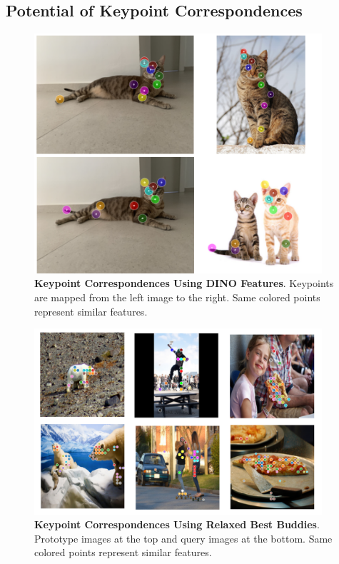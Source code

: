 \subsection{Potential of Keypoint Correspondences}
\label{section:keypoint-correspondences}
\begin{figure}
	\centering
	\includegraphics[width=0.95\textwidth]{Images/main/keypoint-comparison.png}
	\caption[\textbf{Keypoint Correspondences Using DINO Features}]{\textbf{Keypoint Correspondences Using DINO Features}. Keypoints are mapped from the left image to the right. Same colored points represent similar features.}
	\label{fig:correspondecences-vanila}
\end{figure}

\begin{figure}
	\centering
	\includegraphics[width=0.95\textwidth]{Images/main/correspondences.png}
	\caption[\textbf{Keypoint Correspondences Using Relaxed Best Buddies}]{\textbf{Keypoint Correspondences Using Relaxed Best Buddies}. Prototype images at the top and query images at the bottom. Same colored points represent similar features.}
	\label{fig:correspondecences}
\end{figure}

